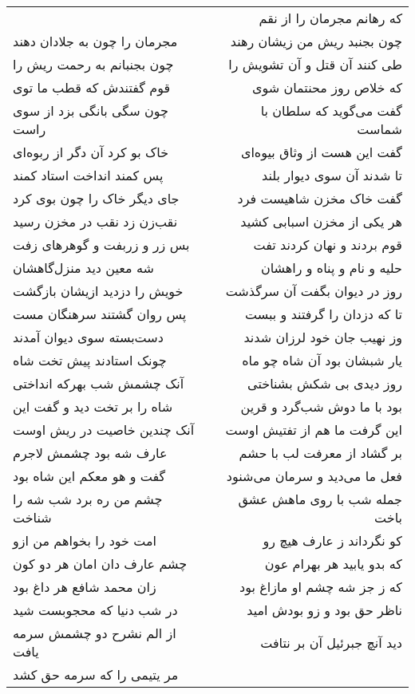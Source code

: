 \begin{center}
\begin{longtable}{l p{0.5cm} r}
&&
که رهانم مجرمان را از نقم
\\
مجرمان را چون به جلادان دهند
&&
چون بجنبد ریش من زیشان رهند
\\
چون بجنبانم به رحمت ریش را
&&
طی کنند آن قتل و آن تشویش را
\\
قوم گفتندش که قطب ما توی
&&
که خلاص روز محنتمان شوی
\\
چون سگی بانگی بزد از سوی راست
&&
گفت می‌گوید که سلطان با شماست
\\
خاک بو کرد آن دگر از ربوه‌ای
&&
گفت این هست از وثاق بیوه‌ای
\\
پس کمند انداخت استاد کمند
&&
تا شدند آن سوی دیوار بلند
\\
جای دیگر خاک را چون بوی کرد
&&
گفت خاک مخزن شاهیست فرد
\\
نقب‌زن زد نقب در مخزن رسید
&&
هر یکی از مخزن اسبابی کشید
\\
بس زر و زربفت و گوهرهای زفت
&&
قوم بردند و نهان کردند تفت
\\
شه معین دید منزل‌گاهشان
&&
حلیه و نام و پناه و راهشان
\\
خویش را دزدید ازیشان بازگشت
&&
روز در دیوان بگفت آن سرگذشت
\\
پس روان گشتند سرهنگان مست
&&
تا که دزدان را گرفتند و ببست
\\
دست‌بسته سوی دیوان آمدند
&&
وز نهیب جان خود لرزان شدند
\\
چونک استادند پیش تخت شاه
&&
یار شبشان بود آن شاه چو ماه
\\
آنک چشمش شب بهرکه انداختی
&&
روز دیدی بی شکش بشناختی
\\
شاه را بر تخت دید و گفت این
&&
بود با ما دوش شب‌گرد و قرین
\\
آنک چندین خاصیت در ریش اوست
&&
این گرفت ما هم از تفتیش اوست
\\
عارف شه بود چشمش لاجرم
&&
بر گشاد از معرفت لب با حشم
\\
گفت و هو معکم این شاه بود
&&
فعل ما می‌دید و سرمان می‌شنود
\\
چشم من ره برد شب شه را شناخت
&&
جمله شب با روی ماهش عشق باخت
\\
امت خود را بخواهم من ازو
&&
کو نگرداند ز عارف هیچ رو
\\
چشم عارف دان امان هر دو کون
&&
که بدو یابید هر بهرام عون
\\
زان محمد شافع هر داغ بود
&&
که ز جز شه چشم او مازاغ بود
\\
در شب دنیا که محجوبست شید
&&
ناظر حق بود و زو بودش امید
\\
از الم نشرح دو چشمش سرمه یافت
&&
دید آنچ جبرئیل آن بر نتافت
\\
مر یتیمی را که سرمه حق کشد

\end{longtable}
\end{center}
